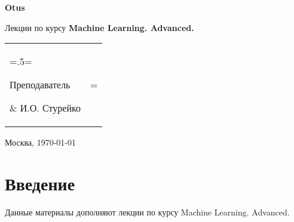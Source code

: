 \documentclass[a4paper, 14pt]{extreport}
\begin{document}
\begin{titlepage}                                                         
	\newpage                                                                        
	\begin{center}                                                        
		\textbf{Otus}                                                                                                                                            
	\end{center}                                                          
	
	\vspace{14em}                                                        
	
	\begin{center}                                                                                      
		\Large Лекции \linebreak                                  
		по курсу  \linebreak 
		\textbf{Machine Learning. Advanced.}
	\end{center}                                                          
	                                                
	                                                        
	\vspace{6em}                                                                    


	\begin{tabularx}{0.9\textwidth}{>{\hsize=.5\hsize\linewidth=\hsize}X
			>{\hsize=2.5\hsize\linewidth=\hsize}r}
			\noindent\parbox[b]{\hsize}{Преподаватель} & \makebox[3cm]{\hrulefill} И.О. Стурейко\\
	\end{tabularx}       
                                  

	\vspace{\fill}                                                    
	
	\begin{center}                                                        
		Москва, \today                                                                
	\end{center}                                                          
	
\end{titlepage}

\setcounter{page}{2} %

\chapter*{Введение}
\begin{onehalfspace}

Данные материалы дополняют лекции по курсу Machine Learning. Advanced.
\end{onehalfspace}

\tableofcontents





\end{document}
